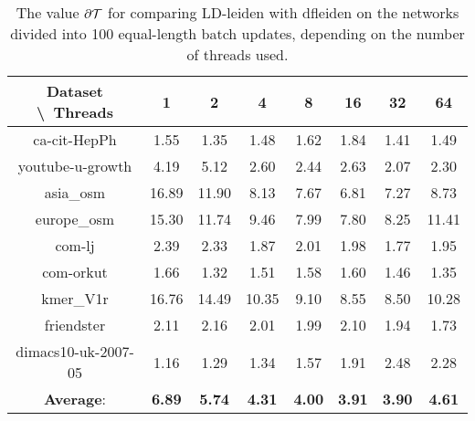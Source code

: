 \begin{table}[H]
	\centering
	\begin{tabular}{|c|c|c|c|c|c|c|c|}
		\hline
		Dataset \textbackslash\ Threads & 1 & 2 & 4 & 8 & 16 & 32 & 64 \\
		\hline
		ca-cit-HepPh & 1.55 & 1.35 & 1.48 & 1.62 & 1.84 & 1.41 & 1.49 \\
		\hline
		youtube-u-growth & 4.19 & 5.12 & 2.60 & 2.44 & 2.63 & 2.07 & 2.30 \\
		\hline
		asia\_osm & 16.89 & 11.90 & 8.13 & 7.67 & 6.81 & 7.27 & 8.73 \\
		\hline
		europe\_osm & 15.30 & 11.74 & 9.46 & 7.99 & 7.80 & 8.25 & 11.41 \\
		\hline
		com-lj & 2.39 & 2.33 & 1.87 & 2.01 & 1.98 & 1.77 & 1.95 \\
		\hline
		com-orkut & 1.66 & 1.32 & 1.51 & 1.58 & 1.60 & 1.46 & 1.35 \\
		\hline
		kmer\_V1r & 16.76 & 14.49 & 10.35 & 9.10 & 8.55 & 8.50 & 10.28 \\
		\hline
		friendster & 2.11 & 2.16 & 2.01 & 1.99 & 2.10 & 1.94 & 1.73 \\
		\hline
		dimacs10-uk-2007-05 & 1.16 & 1.29 & 1.34 & 1.57 & 1.91 & 2.48 & 2.28 \\
		\hline
		\textbf{Average}: & \textbf{6.89} & \textbf{5.74} & \textbf{4.31} & \textbf{4.00} & \textbf{3.91} & \textbf{3.90} & \textbf{4.61} \\
		\hline
	\end{tabular}
\caption{The value $\partial\mathcal{T}$ for comparing LD-leiden with dfleiden on the networks divided into 100 equal-length batch updates, depending on the number of threads used.}
\label{T:scalling:ameanT:100:LD-leiden to dfleiden}
\end{table}